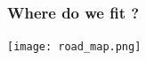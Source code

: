 \documentclass[mathserif, aspectratio=169]{beamer}
\newcommand{\vect}[1]{\boldsymbol{#1}}
\begin{document}

\begin{frame}[fragile]
	\frametitle{Where do we fit ? }
	\begin{center}
		\texttt{[image: road\_map.png]}
	\end{center}
\end{frame}
\end{document}
